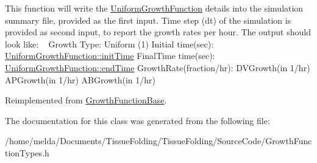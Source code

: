 This function will write the \hyperlink{classUniformGrowthFunction}{Uniform\+Growth\+Function} details into the simulation summary file, provided as the first input. Time step (dt) of the simulation is provided as second input, to report the growth rates per hour. The output should look like\+: ~\newline
 Growth Type\+: Uniform (1) Initial time(sec)\+: \hyperlink{classGrowthFunctionBase_ae92513a7b41637df8e26e7db35ddf97c}{Uniform\+Growth\+Function\+::init\+Time} Final\+Time time(sec)\+: \hyperlink{classGrowthFunctionBase_a3ff4db0573d354a75666a5f3ca446941}{Uniform\+Growth\+Function\+::end\+Time} Growth\+Rate(fraction/hr)\+: D\+V\+Growth(in 1/hr) A\+P\+Growth(in 1/hr) A\+B\+Growth(in 1/hr)

Reimplemented from \hyperlink{classGrowthFunctionBase_a73b474a60caeb5b6b326ecb6a056cfe4}{Growth\+Function\+Base}.



The documentation for this class was generated from the following file\+:\begin{DoxyCompactItemize}
\item 
/home/melda/\+Documents/\+Tissue\+Folding/\+Tissue\+Folding/\+Source\+Code/Growth\+Function\+Types.\+h\end{DoxyCompactItemize}
